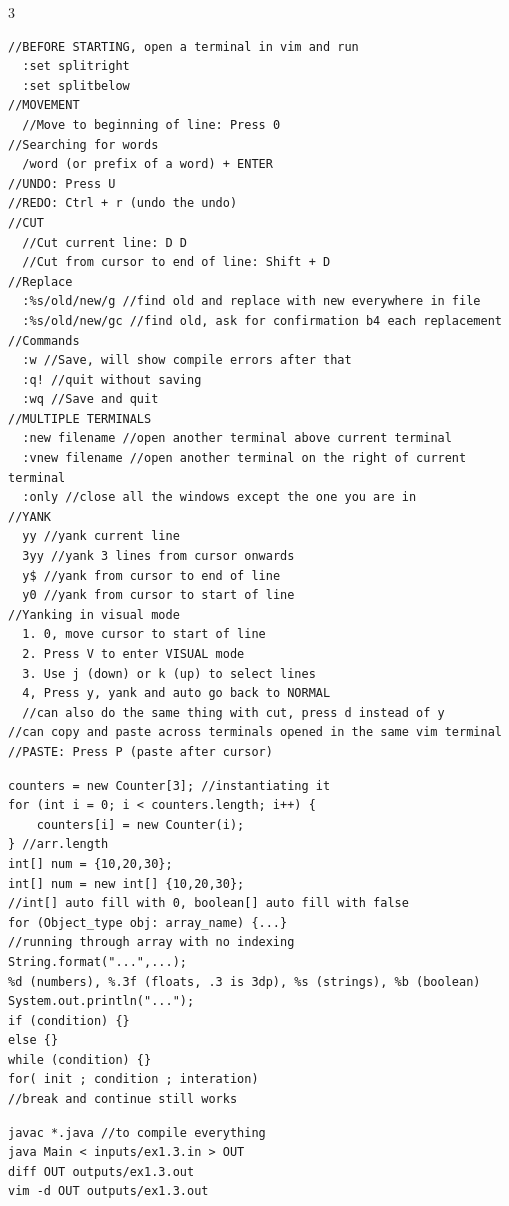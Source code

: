 \documentclass[10pt]{article}
\begin{document}
\begin{multicols*}{3}
\raggedcolumns

\begin{verbatim}
//BEFORE STARTING, open a terminal in vim and run
  :set splitright
  :set splitbelow
//MOVEMENT
  //Move to beginning of line: Press 0
//Searching for words
  /word (or prefix of a word) + ENTER
//UNDO: Press U
//REDO: Ctrl + r (undo the undo)
//CUT
  //Cut current line: D D
  //Cut from cursor to end of line: Shift + D
//Replace
  :%s/old/new/g //find old and replace with new everywhere in file
  :%s/old/new/gc //find old, ask for confirmation b4 each replacement
//Commands
  :w //Save, will show compile errors after that
  :q! //quit without saving
  :wq //Save and quit
//MULTIPLE TERMINALS
  :new filename //open another terminal above current terminal
  :vnew filename //open another terminal on the right of current terminal
  :only //close all the windows except the one you are in
//YANK
  yy //yank current line
  3yy //yank 3 lines from cursor onwards
  y$ //yank from cursor to end of line
  y0 //yank from cursor to start of line
//Yanking in visual mode
  1. 0, move cursor to start of line
  2. Press V to enter VISUAL mode
  3. Use j (down) or k (up) to select lines
  4, Press y, yank and auto go back to NORMAL
  //can also do the same thing with cut, press d instead of y
//can copy and paste across terminals opened in the same vim terminal
//PASTE: Press P (paste after cursor)
\end{verbatim}
\begin{verbatim}
counters = new Counter[3]; //instantiating it
for (int i = 0; i < counters.length; i++) {
    counters[i] = new Counter(i);
} //arr.length
int[] num = {10,20,30};
int[] num = new int[] {10,20,30};
//int[] auto fill with 0, boolean[] auto fill with false
for (Object_type obj: array_name) {...}
//running through array with no indexing
String.format("...",...);
%d (numbers), %.3f (floats, .3 is 3dp), %s (strings), %b (boolean)
System.out.println("...");
if (condition) {}
else {}
while (condition) {}
for( init ; condition ; interation)
//break and continue still works
\end{verbatim}
\begin{verbatim}
javac *.java //to compile everything
java Main < inputs/ex1.3.in > OUT
diff OUT outputs/ex1.3.out
vim -d OUT outputs/ex1.3.out
\end{verbatim}

\end{multicols*}
\end{document}
